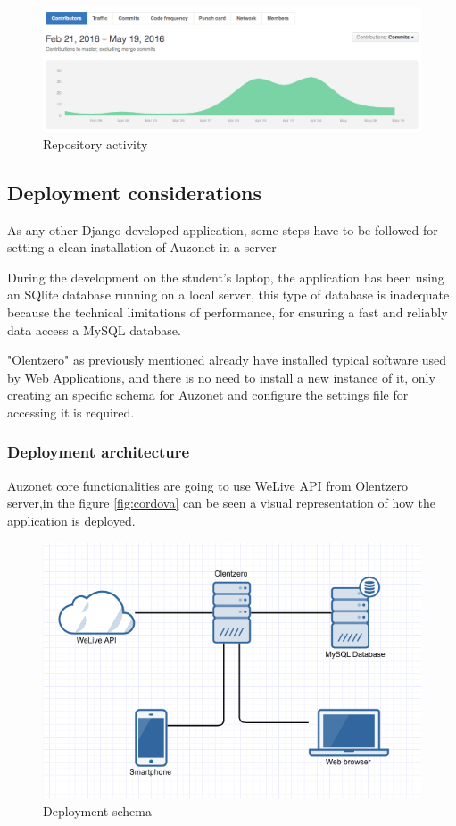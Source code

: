\documentclass{DeustoFDP}
\begin{document}
\begin{figure}[h!]
\centering
\includegraphics[width=0.8\linewidth]{fig/githubactivity}
\caption[Repository activity]{Repository activity}
\label{fig:githubactivity}
\end{figure}

\subsection{Deployment considerations}
As any other Django developed application, some steps have to be followed for setting a clean installation of Auzonet in a server

During the development on the student's laptop, the application has been using an SQlite database running on a local server, this type of database is inadequate because the technical limitations of performance, for ensuring a fast and reliably data access a MySQL database. 

"Olentzero" as previously mentioned already have installed typical software used by Web Applications, and there is no need to install a new instance of it, only creating an specific schema for Auzonet and configure the settings file for accessing it is required. 


\subsubsection{Deployment architecture}
Auzonet core functionalities are going to use WeLive API from Olentzero server,in the figure \ref{fig:cordova} can be seen a visual representation of how the application is deployed.

\begin{figure}[h!]
\centering
\includegraphics[width=0.7\linewidth]{fig/deployment}
\caption[Deployment schema]{Deployment schema}
\label{fig:deployment}
\end{figure}
\end{document}
